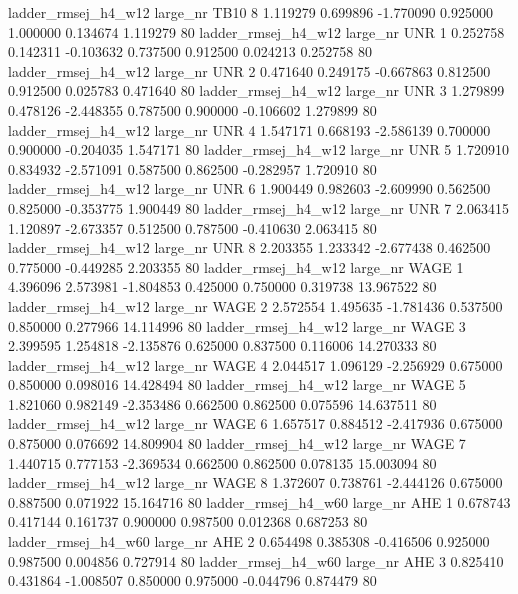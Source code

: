 ladder_rmsej_h4_w12   large_nr     TB10                 8  1.119279  0.699896  -1.770090 0.925000 1.000000  0.134674    1.119279 80
ladder_rmsej_h4_w12   large_nr      UNR                 1  0.252758  0.142311  -0.103632 0.737500 0.912500  0.024213    0.252758 80
ladder_rmsej_h4_w12   large_nr      UNR                 2  0.471640  0.249175  -0.667863 0.812500 0.912500  0.025783    0.471640 80
ladder_rmsej_h4_w12   large_nr      UNR                 3  1.279899  0.478126  -2.448355 0.787500 0.900000 -0.106602    1.279899 80
ladder_rmsej_h4_w12   large_nr      UNR                 4  1.547171  0.668193  -2.586139 0.700000 0.900000 -0.204035    1.547171 80
ladder_rmsej_h4_w12   large_nr      UNR                 5  1.720910  0.834932  -2.571091 0.587500 0.862500 -0.282957    1.720910 80
ladder_rmsej_h4_w12   large_nr      UNR                 6  1.900449  0.982603  -2.609990 0.562500 0.825000 -0.353775    1.900449 80
ladder_rmsej_h4_w12   large_nr      UNR                 7  2.063415  1.120897  -2.673357 0.512500 0.787500 -0.410630    2.063415 80
ladder_rmsej_h4_w12   large_nr      UNR                 8  2.203355  1.233342  -2.677438 0.462500 0.775000 -0.449285    2.203355 80
ladder_rmsej_h4_w12   large_nr     WAGE                 1  4.396096  2.573981  -1.804853 0.425000 0.750000  0.319738   13.967522 80
ladder_rmsej_h4_w12   large_nr     WAGE                 2  2.572554  1.495635  -1.781436 0.537500 0.850000  0.277966   14.114996 80
ladder_rmsej_h4_w12   large_nr     WAGE                 3  2.399595  1.254818  -2.135876 0.625000 0.837500  0.116006   14.270333 80
ladder_rmsej_h4_w12   large_nr     WAGE                 4  2.044517  1.096129  -2.256929 0.675000 0.850000  0.098016   14.428494 80
ladder_rmsej_h4_w12   large_nr     WAGE                 5  1.821060  0.982149  -2.353486 0.662500 0.862500  0.075596   14.637511 80
ladder_rmsej_h4_w12   large_nr     WAGE                 6  1.657517  0.884512  -2.417936 0.675000 0.875000  0.076692   14.809904 80
ladder_rmsej_h4_w12   large_nr     WAGE                 7  1.440715  0.777153  -2.369534 0.662500 0.862500  0.078135   15.003094 80
ladder_rmsej_h4_w12   large_nr     WAGE                 8  1.372607  0.738761  -2.444126 0.675000 0.887500  0.071922   15.164716 80
ladder_rmsej_h4_w60   large_nr      AHE                 1  0.678743  0.417144   0.161737 0.900000 0.987500  0.012368    0.687253 80
ladder_rmsej_h4_w60   large_nr      AHE                 2  0.654498  0.385308  -0.416506 0.925000 0.987500  0.004856    0.727914 80
ladder_rmsej_h4_w60   large_nr      AHE                 3  0.825410  0.431864  -1.008507 0.850000 0.975000 -0.044796    0.874479 80
